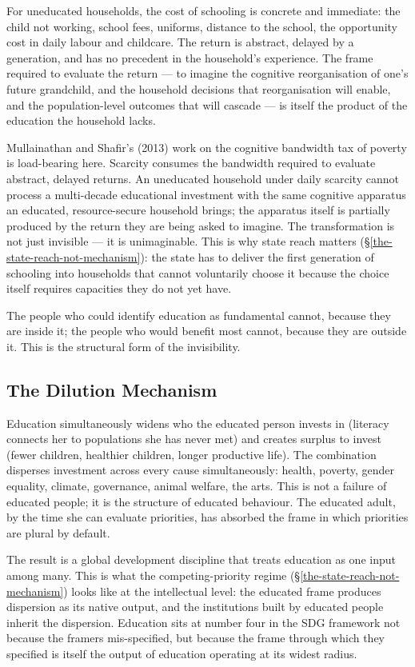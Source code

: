 \documentclass[12pt,letterpaper]{article}
\begin{document}
For uneducated households, the cost of schooling is concrete and
immediate: the child not working, school fees, uniforms, distance to
the school, the opportunity cost in daily labour and childcare. The
return is abstract, delayed by a generation, and has no precedent in
the household's experience. The frame required to evaluate the
return --- to imagine the cognitive reorganisation of one's future
grandchild, and the household decisions that reorganisation will
enable, and the population-level outcomes that will cascade --- is
itself the product of the education the household lacks.

Mullainathan and Shafir's (2013) work on the cognitive bandwidth tax
of poverty is load-bearing here. Scarcity consumes the bandwidth
required to evaluate abstract, delayed returns. An uneducated
household under daily scarcity cannot process a multi-decade
educational investment with the same cognitive apparatus an educated,
resource-secure household brings; the apparatus itself is partially
produced by the return they are being asked to imagine. The
transformation is not just invisible --- it is unimaginable. This is
why state reach matters
(\S\ref{the-state-reach-not-mechanism}):
the state has to deliver the first generation of schooling into
households that cannot voluntarily choose it because the choice
itself requires capacities they do not yet have.

The people who could identify education as fundamental cannot,
because they are inside it; the people who would benefit most cannot,
because they are outside it. This is the structural form of the
invisibility.

\subsection{The Dilution Mechanism}\label{the-dilution-mechanism}

Education simultaneously widens who the educated person invests in
(literacy connects her to populations she has never met) and creates
surplus to invest (fewer children, healthier children, longer
productive life). The combination disperses investment across every
cause simultaneously: health, poverty, gender equality, climate,
governance, animal welfare, the arts. This is not a failure of
educated people; it is the structure of educated behaviour. The
educated adult, by the time she can evaluate priorities, has absorbed
the frame in which priorities are plural by default.

The result is a global development discipline that treats education
as one input among many. This is what the competing-priority regime
(\S\ref{the-state-reach-not-mechanism})
looks like at the intellectual level: the educated frame produces
dispersion as its native output, and the institutions built by
educated people inherit the dispersion. Education sits at number
four in the SDG framework not because the framers mis-specified, but
because the frame through which they specified is itself the output
of education operating at its widest radius.
\end{document}
